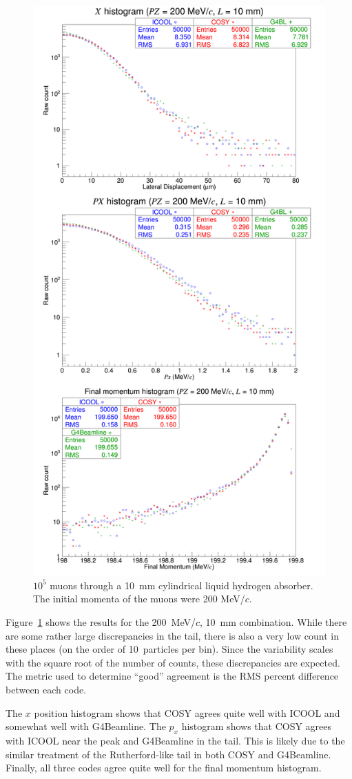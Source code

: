 \documentclass[a4paper,11pt]{article}
\begin{document}
\begin{figure}[H]
  \centering
    \includegraphics[width=0.7\columnwidth]{benchmarking.200.10} 
  \caption{$10^5$ muons through a 10~mm cylindrical liquid hydrogen absorber. The initial momenta of the muons were 200 MeV/$c$.}
  \label{fig:benchmarking.100.1}
\end{figure}

Figure~\ref{fig:benchmarking.100.1} shows the results for the 200~MeV/$c$, 10~mm combination. While there are some rather large discrepancies in the tail, there is also a very low count in these places (on the order of 10~particles per bin). Since the variability scales with the square root of the number of counts, these discrepancies are expected. The metric used to determine ``good'' agreement is the RMS percent difference between each code.

The $x$ position histogram shows that COSY agrees quite well with ICOOL and somewhat well with G4Beamline. The $p_x$ histogram shows that COSY agrees with ICOOL near the peak and G4Beamline in the tail. This is likely due to the similar treatment of the Rutherford-like tail in both COSY and G4Beamline. Finally, all three codes agree quite well for the final momentum histogram.
\end{document}
